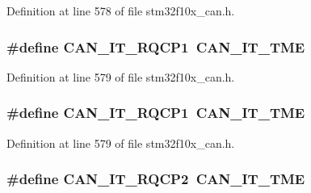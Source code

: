 Definition at line 578 of file stm32f10x\+\_\+can.\+h.

\subsubsection[{\texorpdfstring{C\+A\+N\+\_\+\+I\+T\+\_\+\+R\+Q\+C\+P1}{CAN_IT_RQCP1}}]{\setlength{\rightskip}{0pt plus 5cm}\#define C\+A\+N\+\_\+\+I\+T\+\_\+\+R\+Q\+C\+P1~{\bf C\+A\+N\+\_\+\+I\+T\+\_\+\+T\+ME}}\hypertarget{group___c_a_n__interrupts_ga42e5c8e89e0f06f3250916fcfb21dc22}{}\label{group___c_a_n__interrupts_ga42e5c8e89e0f06f3250916fcfb21dc22}


Definition at line 579 of file stm32f10x\+\_\+can.\+h.

\subsubsection[{\texorpdfstring{C\+A\+N\+\_\+\+I\+T\+\_\+\+R\+Q\+C\+P1}{CAN_IT_RQCP1}}]{\setlength{\rightskip}{0pt plus 5cm}\#define C\+A\+N\+\_\+\+I\+T\+\_\+\+R\+Q\+C\+P1~{\bf C\+A\+N\+\_\+\+I\+T\+\_\+\+T\+ME}}\hypertarget{group___c_a_n__interrupts_ga42e5c8e89e0f06f3250916fcfb21dc22}{}\label{group___c_a_n__interrupts_ga42e5c8e89e0f06f3250916fcfb21dc22}


Definition at line 579 of file stm32f10x\+\_\+can.\+h.

\subsubsection[{\texorpdfstring{C\+A\+N\+\_\+\+I\+T\+\_\+\+R\+Q\+C\+P2}{CAN_IT_RQCP2}}]{\setlength{\rightskip}{0pt plus 5cm}\#define C\+A\+N\+\_\+\+I\+T\+\_\+\+R\+Q\+C\+P2~{\bf C\+A\+N\+\_\+\+I\+T\+\_\+\+T\+ME}}\hypertarget{group___c_a_n__interrupts_gacc634c3e29cdc9622081021dcda3127b}{}\label{group___c_a_n__interrupts_gacc634c3e29cdc9622081021dcda3127b}


